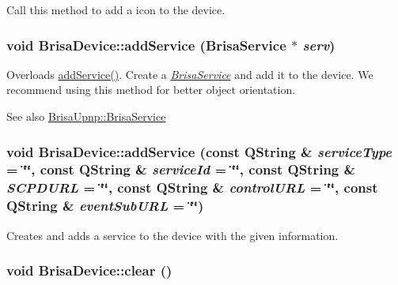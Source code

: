 Call this method to add a icon to the device. \hypertarget{classBrisaUpnp_1_1BrisaDevice_afb43e358eaea3fe0834d1d82913ba1ec}{
\subsubsection[{addService}]{\setlength{\rightskip}{0pt plus 5cm}void BrisaDevice::addService ({\bf BrisaService} $\ast$ {\em serv})}}
\label{classBrisaUpnp_1_1BrisaDevice_afb43e358eaea3fe0834d1d82913ba1ec}


Overloads \hyperlink{classBrisaUpnp_1_1BrisaDevice_a2a5879c40079f073fc08b06d99427dcd}{addService()}. Create a {\itshape \hyperlink{classBrisaUpnp_1_1BrisaService}{BrisaService}\/} and add it to the device. We recommend using this method for better object orientation. \begin{DoxySeeAlso}{See also}
\hyperlink{classBrisaUpnp_1_1BrisaService}{BrisaUpnp::BrisaService} 
\end{DoxySeeAlso}
\hypertarget{classBrisaUpnp_1_1BrisaDevice_a2a5879c40079f073fc08b06d99427dcd}{
\subsubsection[{addService}]{\setlength{\rightskip}{0pt plus 5cm}void BrisaDevice::addService (const QString \& {\em serviceType} = {\ttfamily \char`\"{}\char`\"{}}, \/  const QString \& {\em serviceId} = {\ttfamily \char`\"{}\char`\"{}}, \/  const QString \& {\em SCPDURL} = {\ttfamily \char`\"{}\char`\"{}}, \/  const QString \& {\em controlURL} = {\ttfamily \char`\"{}\char`\"{}}, \/  const QString \& {\em eventSubURL} = {\ttfamily \char`\"{}\char`\"{}})}}
\label{classBrisaUpnp_1_1BrisaDevice_a2a5879c40079f073fc08b06d99427dcd}


Creates and adds a service to the device with the given information. \hypertarget{classBrisaUpnp_1_1BrisaDevice_a0e44a74fcebe4ad71d5951f26f0925aa}{
\subsubsection[{clear}]{\setlength{\rightskip}{0pt plus 5cm}void BrisaDevice::clear ()}}
\label{classBrisaUpnp_1_1BrisaDevice_a0e44a74fcebe4ad71d5951f26f0925aa}


